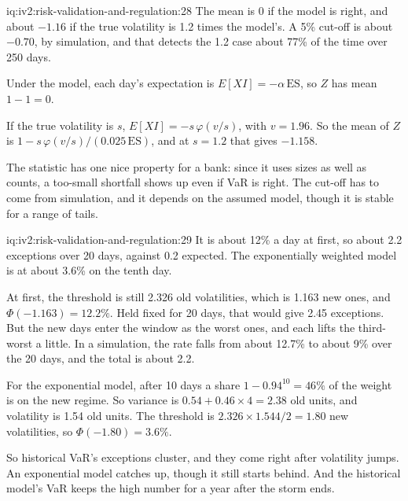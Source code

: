 \begin{solution}{iq:iv2:risk-validation-and-regulation:28}
The mean is 0 if the model is right, and about $-1.16$ if the true volatility is 1.2 times the model's. A 5\% cut-off is about $-0.70$, by simulation, and that detects the 1.2 case about 77\% of the time over 250 days.

Under the model, each day's expectation is $E[X I] = -\alpha\,\mathrm{ES}$, so $Z$ has mean $1 - 1 = 0$.

If the true volatility is $s$, $E[X I] = -s\,\varphi(v/s)$, with $v = 1.96$. So the mean of $Z$ is $1 - s\,\varphi(v/s)/(0.025\,\mathrm{ES})$, and at $s = 1.2$ that gives $-1.158$.

The statistic has one nice property for a bank: since it uses sizes as well as counts, a too-small shortfall shows up even if VaR is right. The cut-off has to come from simulation, and it depends on the assumed model, though it is stable for a range of tails.

\end{solution}

\begin{solution}{iq:iv2:risk-validation-and-regulation:29}
It is about 12\% a day at first, so about 2.2 exceptions over 20 days, against 0.2 expected. The exponentially weighted model is at about 3.6\% on the tenth day.

At first, the threshold is still 2.326 old volatilities, which is 1.163 new ones, and $\Phi(-1.163) = 12.2\%$. Held fixed for 20 days, that would give 2.45 exceptions. But the new days enter the window as the worst ones, and each lifts the third-worst a little. In a simulation, the rate falls from about 12.7\% to about 9\% over the 20 days, and the total is about 2.2.

For the exponential model, after 10 days a share $1 - 0.94^{10} = 46\%$ of the weight is on the new regime. So variance is $0.54 + 0.46 \times 4 = 2.38$ old units, and volatility is 1.54 old units. The threshold is $2.326 \times 1.544/2 = 1.80$ new volatilities, so $\Phi(-1.80) = 3.6\%$.

So historical VaR's exceptions cluster, and they come right after volatility jumps. An exponential model catches up, though it still starts behind. And the historical model's VaR keeps the high number for a year after the storm ends.

\end{solution}

